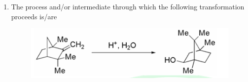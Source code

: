 \documentclass[journal,12pt,onecolumn]{IEEEtran}
\theoremstyle{remark}
\begin{document}
\begin{enumerate}
\begin{enumerate}
    \end{enumerate}      \hfill{}



\item The process and/or intermediate through which the following transformation proceeds is/are
 \begin{figure}[H]   
        \centering
        \includegraphics[width=0.4\columnwidth]{figs/q54.png}
        \caption*{}
        \label{fig:placeholder}
    \end{figure}
    \begin{enumerate}
    \end{enumerate}      \hfill{}




\end{enumerate}
\end{document}
